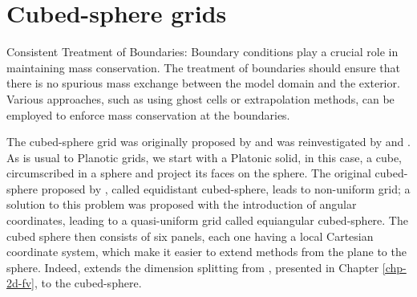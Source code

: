 \chapter{Cubed-sphere grids}
\label{chp-cs-grids}

Consistent Treatment of Boundaries: Boundary conditions play a crucial role in maintaining mass conservation. 
The treatment of boundaries should ensure that there is no spurious mass exchange between the model domain and the exterior. 
Various approaches, such as using ghost cells or extrapolation methods, can be employed to enforce mass conservation at the boundaries.

The cubed-sphere grid was originally proposed by \citet{sadourny:1972}
and was reinvestigated by \citet{ronchi:1996} and \citet{rancic:1996}.
As is usual to Planotic grids, we start with a Platonic solid, in this case, a cube,
circumscribed in a sphere and project its faces on the sphere.
The original cubed-sphere proposed by \citet{sadourny:1972}, called equidistant cubed-sphere, leads to non-uniform grid;
a solution to this problem was proposed with the introduction of angular coordinates, leading to a quasi-uniform grid
called equiangular cubed-sphere.
The cubed sphere then consists of six panels, each one having a local Cartesian coordinate system, which 
make it easier to extend methods from the plane to the sphere.
Indeed, \citet{putman:2007} extends the dimension splitting from \citet{lin:1996}, presented in
Chapter \ref{chp-2d-fv}, to the cubed-sphere.

